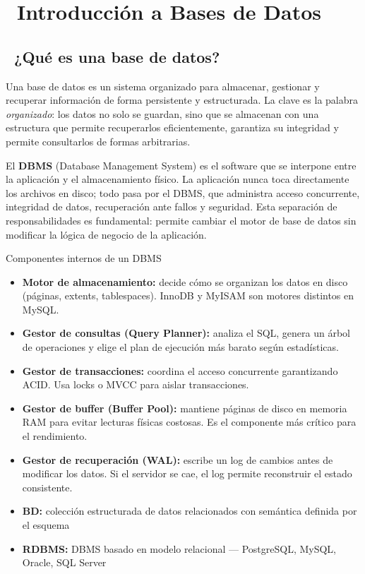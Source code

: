 \chapter[Introducción a Bases de Datos]{~Introducción a Bases de Datos}

\section[¿Qué es una base de datos?]{~¿Qué es una base de datos?}

Una base de datos es un sistema organizado para almacenar, gestionar y recuperar información de forma persistente y estructurada.
La clave es la palabra \emph{organizado}: los datos no solo se guardan, sino que se almacenan con una estructura que permite recuperarlos eficientemente, garantiza su integridad y permite consultarlos de formas arbitrarias.

El \textbf{DBMS} (Database Management System) es el software que se interpone entre la aplicación y el almacenamiento físico.
La aplicación nunca toca directamente los archivos en disco; todo pasa por el DBMS, que administra acceso concurrente, integridad de datos, recuperación ante fallos y seguridad.
Esta separación de responsabilidades es fundamental: permite cambiar el motor de base de datos sin modificar la lógica de negocio de la aplicación.

\begin{teoriabox}{Componentes internos de un DBMS}
\begin{itemize}
  \item \textbf{Motor de almacenamiento:} decide cómo se organizan los datos en disco (páginas, extents, tablespaces). InnoDB y MyISAM son motores distintos en MySQL.
  \item \textbf{Gestor de consultas (Query Planner):} analiza el SQL, genera un árbol de operaciones y elige el plan de ejecución más barato según estadísticas.
  \item \textbf{Gestor de transacciones:} coordina el acceso concurrente garantizando ACID. Usa locks o MVCC para aislar transacciones.
  \item \textbf{Gestor de buffer (Buffer Pool):} mantiene páginas de disco en memoria RAM para evitar lecturas físicas costosas. Es el componente más crítico para el rendimiento.
  \item \textbf{Gestor de recuperación (WAL):} escribe un log de cambios antes de modificar los datos. Si el servidor se cae, el log permite reconstruir el estado consistente.
  \item \textbf{BD:} colección estructurada de datos relacionados con semántica definida por el esquema
  \item \textbf{RDBMS:} DBMS basado en modelo relacional — PostgreSQL, MySQL, Oracle, SQL Server
\end{itemize}
\end{teoriabox}

